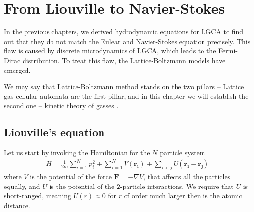 \chapter{From Liouville to Navier-Stokes}
In the previous chapters, we derived hydrodynamic equations for LGCA to find out that they do not match the Eulear and Navier-Stokes equation precisely. This flaw is caused by discrete microdynamics of LGCA, which leads to the Fermi-Dirac distribution.
To treat this flaw, the Lattice-Boltzmann models have emerged.

We may say that Lattice-Boltzmann method stands on the two pillars -- Lattice gas cellular automata are the first pillar, and in this chapter we will establish the second one -- kinetic theory of gasses \cite{tong}.	
%

%


%
%
%
%
%
%
%
%
%
%

	
\section{Liouville's equation}
Let us start by invoking the Hamiltonian for the $N$ particle system
\begin{align*}
H = \frac{1}{2m} \sum_{i=1}^N p_i^2 + \sum_{i=1}^N V(\bm{r_i}) + \sum_{i<j} U(\bm{r_i} - \bm{r_j})
\end{align*}
where $V$ is the potential of the force $\bm{F}= -\nabla V$, that affects all the particles equally, and $U$ is the potential of the $2$-particle interactions. We require that $U$ is short-ranged, meaning $U(r) \approx 0$ for $r$ of order much larger then is the atomic distance.

